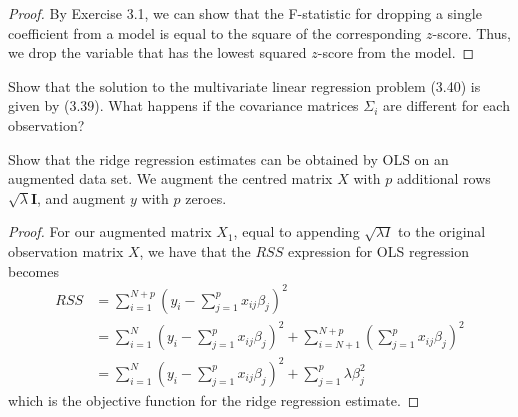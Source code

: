 \begin{proof}
    By Exercise 3.1, we can show that the F-statistic for dropping a single coefficient from a model is equal to the square of the corresponding $z$-score.  Thus, we drop the variable that has the lowest squared $z$-score from the model.
\end{proof}

\begin{exer}
    Show that the solution to the multivariate linear regression problem (3.40) is given by (3.39).  What happens if the covariance matrices $\Sigma_i$ are different for each observation?
\end{exer}

\begin{exer}
    Show that the ridge regression estimates can be obtained by OLS on an augmented data set.  We augment the centred matrix $X$ with $p$ additional rows $\sqrt{\lambda} \mathbf{I}$, and augment $y$ with $p$ zeroes. 

\end{exer}
\begin{proof}
    For our augmented matrix $X_1$, equal to appending $\sqrt{\lambda I}$ to the original observation matrix $X$, we have that the $RSS$ expression for OLS regression becomes \begin{align*}
        RSS &= \sum_{i=1}^{N+p} \left(y_i - \sum_{j=1}^p x_{ij} \beta_j \right)^2 \\
            &= \sum_{i=1}^{N} \left( y_i - \sum_{j=1}^p x_{ij} \beta_j \right)^2 + \sum_{i = N + 1}^{N+p} \left(\sum_{j=1}^p x_{ij} \beta_j \right)^2 \\
            &= \sum_{i=1}^{N} \left( y_i - \sum_{j=1}^p x_{ij} \beta_j \right)^2 + \sum_{j=1}^p \lambda \beta_j^2 
    \end{align*} which is the objective function for the ridge regression estimate.
\end{proof}
